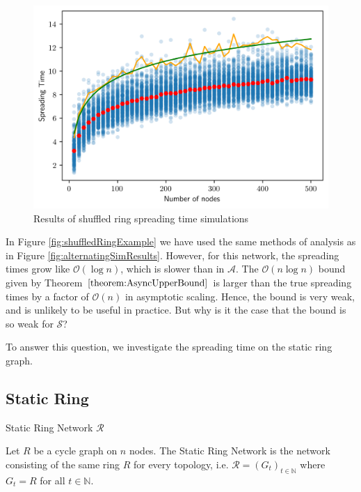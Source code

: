 \begin{figure}[h]
	\centering
	\includegraphics[width=1\textwidth]{./figures/shuffle_ring_simulation_results.png}
	\caption{Results of shuffled ring spreading time simulations}
	\label{fig:shuffleRingSimResults}
\end{figure}

In Figure \ref{fig:shuffledRingExample} we have used the same methods of analysis as in Figure \ref{fig:alternatingSimResults}. However, for this network, the spreading times grow like $\mathcal{O}(\log n)$, which is slower than in $\mathcal{A}$.
The $\mathcal{O}(n \log n)$ bound given by Theorem $\ref{theorem:AsyncUpperBound}$ is larger than the true spreading times by a factor of $\mathcal{O}(n)$ in asymptotic scaling. Hence, the bound is very weak, and is unlikely to be useful in practice. But why is it the case that the bound is so weak for $\mathcal{S}$?

To answer this question, we investigate the spreading time on the static ring graph.

\subsection{Static Ring}

\begin{definition}
	Static Ring Network $\mathcal{R}$

	\noindent
	Let $R$ be a cycle graph on $n$ nodes. The Static Ring Network is the network consisting of the same ring $R$ for every topology, i.e. $\mathcal{R} = (G_t)_{t \in \mathbb{N}}$ where $G_t = R$ for all $t \in \mathbb{N}$. 
\end{definition}

